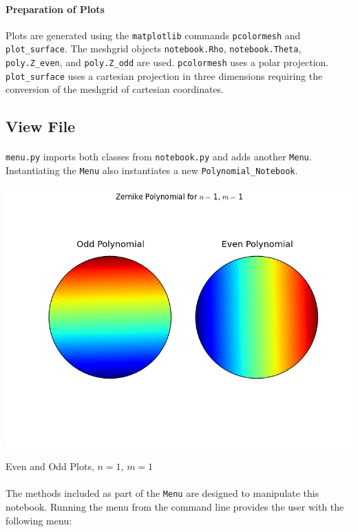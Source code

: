 \documentclass{tufte-handout}
\begin{document}
\paragraph{Preparation of Plots}
Plots are generated using the \Verb|matplotlib| commands \Verb|pcolormesh| and \Verb|plot_surface|. The meshgrid objects \Verb|notebook.Rho|, \Verb|notebook.Theta|, \Verb|poly.Z_even|, and \Verb|poly.Z_odd| are used. \Verb|pcolormesh| uses a polar projection. \Verb|plot_surface| uses a cartesian projection in three dimensions requiring the conversion of the meshgrid of cartesian coordinates.


\subsection{View File}

\paragraph{}\Verb|menu.py| imports both classes from \Verb|notebook.py| and adds another \Verb|Menu|.  Instantiating the \Verb|Menu| also instantiates a new \Verb|Polynomial_Notebook|.  

\begin{marginfigure}%
  \includegraphics[width=\linewidth]{img/1-1.png}
  \caption{Even and Odd Plots, $n=1$, $m=1$}
\end{marginfigure}

\paragraph{}The methods included as part of the \Verb|Menu| are designed to manipulate this notebook.  Running the menu from the command line provides the user with the following menu:
\end{document}

